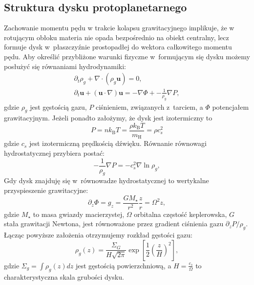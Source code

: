 \subsection{Struktura dysku protoplanetarnego}
Zachowanie momentu pędu w trakcie kolapsu grawitacyjnego implikuje, że w
rotującym obłoku materia nie opada bezpośrednio na obiekt centralny, lecz formuje dysk
w~płaszczyźnie prostopadłej do wektora całkowitego momentu pędu. Aby określić
przybliżone warunki fizyczne w~formującym się dysku możemy posłużyć się
równaniami hydrodynamiki:
%
\begin{gather}
   \partial_t \rho_g + \nabla\cdot\left(\rho_g\mathbf{u}\right) = 0,
   \label{eq:hd1}\\
\partial_t \mathbf{u} + \left(\mathbf{u}\cdot\nabla\right)\mathbf{u} = 
-\nabla\Phi + -\frac{1}{\rho_g} \nabla P, \label{eq:hd2}
\end{gather}
%
gdzie $\rho_g$ jest gęstością gazu, $P$ ciśnieniem, 
związanych z~tarciem, a $\Phi$ potencjałem grawitacyjnym. Jeżeli ponadto
założymy, że dysk jest izotermiczny to
\begin{equation}
   P = n k_{\textrm{B}} T = \frac{\rho k_{\textrm{B}} T}{m_{\textrm{H}}} = \rho
   c_s^2 
\end{equation}
gdzie $c_s$ jest izotermiczną prędkością dźwięku.
Równanie równowagi hydrostatycznej przybiera postać:
\begin{equation}
   -\frac{1}{\rho_g}\nabla P = -c_s^2\nabla\ln\rho_g,
\end{equation}
%
Gdy dysk znajduję się w~równowadze hydrostatycznej to wertykalne
przyspieszenie grawitacyjne:
%
\begin{equation}
   \partial_z \Phi = g_z = \frac{GM_\star}{r^2}\frac{z}{r} = \Omega^2 z,
\end{equation} 
%
gdzie $M_\star$ to masa gwiazdy macierzystej, $\Omega$ orbitalna częstość
keplerowska, $G$ stała grawitacji Newtona, jest równoważone przez gradient
ciśnienia gazu $\partial_z P / \rho_g$.
Łącząc powyższe założenia otrzymujemy rozkład gęstości gazu:
%
\begin{equation} \label{eq:zeq}
   \rho_g(z) = \frac{\Sigma_G}{H\sqrt{2\pi}} \exp \left[
   \frac{1}{2}\left(\frac{z}{H}\right)^2 \right],
\end{equation}
%
gdzie $\Sigma_g = \int \rho_g(z) dz$ jest gęstością powierzchniową, a
$H=\frac{c_s}{\Omega}$ to charakterystyczna skala grubości dysku.
%

